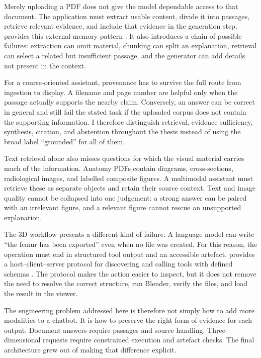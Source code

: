 Merely uploading a PDF does not give the model dependable access to that document. The application must extract usable content, divide it into passages, retrieve relevant evidence, and include that evidence in the generation step. \RAG{} provides this external-memory pattern \parencite{lewis2020}. It also introduces a chain of possible failures: extraction can omit material, chunking can split an explanation, retrieval can select a related but insufficient passage, and the generator can add details not present in the context.

For a course-oriented assistant, provenance has to survive the full route from ingestion to display. A filename and page number are helpful only when the passage actually supports the nearby claim. Conversely, an answer can be correct in general and still fail the stated task if the uploaded corpus does not contain the supporting information. I therefore distinguish retrieval, evidence sufficiency, synthesis, citation, and abstention throughout the thesis instead of using the broad label ``grounded'' for all of them.

Text retrieval alone also misses questions for which the visual material carries much of the information. Anatomy PDFs contain diagrams, cross-sections, radiological images, and labelled composite figures. A multimodal assistant must retrieve these as separate objects and retain their source context. Text and image quality cannot be collapsed into one judgement: a strong answer can be paired with an irrelevant figure, and a relevant figure cannot rescue an unsupported explanation.

The 3D workflow presents a different kind of failure. A language model can write ``the femur has been exported'' even when no file was created. For this reason, the operation must end in structured tool output and an accessible artefact. \MCP{} provides a host--client--server protocol for discovering and calling tools with defined schemas \parencite{mcp20250618}. The protocol makes the action easier to inspect, but it does not remove the need to resolve the correct structure, run Blender, verify the files, and load the result in the viewer.

The engineering problem addressed here is therefore not simply how to add more modalities to a chatbot. It is how to preserve the right form of evidence for each output. Document answers require passages and source handling. Three-dimensional requests require constrained execution and artefact checks. The final architecture grew out of making that difference explicit.

